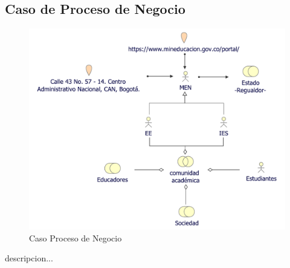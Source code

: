 \subsection{Caso  de Proceso de Negocio}
\begin{figure}[h!]
	\centering
	\includegraphics[width=.9\linewidth]{imgs/caso/negocio/organizacion}
	\caption{Caso Proceso de Negocio}
\end{figure}
descripcion...
